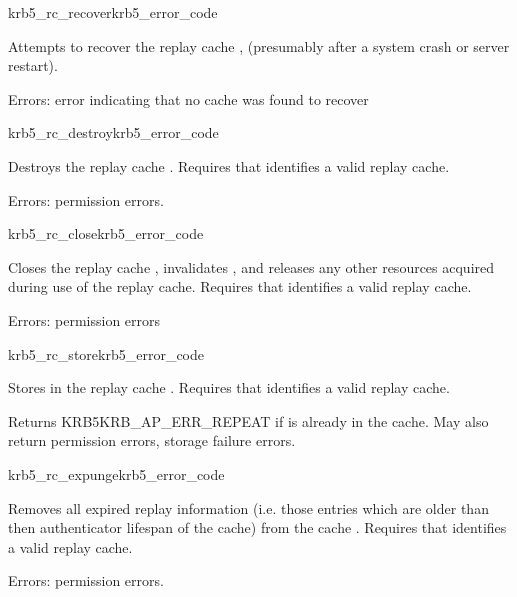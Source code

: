 \begin{funcdecl}{krb5_rc_recover}{krb5_error_code}{\funcin}
\end{funcdecl}
Attempts to recover the replay cache , (presumably after a
system crash or server restart).

Errors: error indicating that no cache was found to recover

\begin{funcdecl}{krb5_rc_destroy}{krb5_error_code}{\funcin}
\end{funcdecl}

Destroys the replay cache .
Requires that  identifies a valid replay cache.

Errors: permission errors.

\begin{funcdecl}{krb5_rc_close}{krb5_error_code}{\funcin}
\end{funcdecl}

Closes the replay cache , invalidates ,
and releases any other resources acquired during use of the replay cache.
Requires that  identifies a valid replay cache.

Errors: permission errors

\begin{funcdecl}{krb5_rc_store}{krb5_error_code}{\funcin}
\end{funcdecl}
Stores  in the replay cache .
Requires that  identifies a valid replay cache.

Returns KRB5KRB_AP_ERR_REPEAT if  is already in the
cache.  May also return permission errors, storage failure errors.

\begin{funcdecl}{krb5_rc_expunge}{krb5_error_code}{\funcin}
\end{funcdecl}
Removes all expired replay information (i.e. those entries which are
older than then authenticator lifespan of the cache) from the cache
.  Requires that  identifies a valid replay
cache.

Errors: permission errors.

